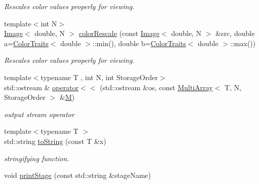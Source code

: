 \begin{DoxyCompactItemize}
\begin{DoxyCompactList}\small\item\em Rescales color values properly for viewing. \end{DoxyCompactList}\item 
\hypertarget{group___image_ga0d96ddd420fb39361b01256716c2c776}{{\footnotesize template$<$int N$>$ }\\\hyperlink{class_d_o_1_1_image}{Image}$<$ double, N $>$ \hyperlink{group___image_ga0d96ddd420fb39361b01256716c2c776}{color\-Rescale} (const \hyperlink{class_d_o_1_1_image}{Image}$<$ double, N $>$ \&src, double a=\hyperlink{struct_d_o_1_1_color_traits}{Color\-Traits}$<$ double $>$\-::min(), double b=\hyperlink{struct_d_o_1_1_color_traits}{Color\-Traits}$<$ double $>$\-::max())}\label{group___image_ga0d96ddd420fb39361b01256716c2c776}

\begin{DoxyCompactList}\small\item\em Rescales color values properly for viewing. \end{DoxyCompactList}\item 
\hypertarget{group___multi_array_ga9223155c64483239f48caab75fc0557d}{{\footnotesize template$<$typename T , int N, int Storage\-Order$>$ }\\std\-::ostream \& \hyperlink{group___multi_array_ga9223155c64483239f48caab75fc0557d}{operator$<$$<$} (std\-::ostream \&os, const \hyperlink{class_d_o_1_1_multi_array}{Multi\-Array}$<$ T, N, Storage\-Order $>$ \&\hyperlink{struct_d_o_1_1_m}{M})}\label{group___multi_array_ga9223155c64483239f48caab75fc0557d}

\begin{DoxyCompactList}\small\item\em output stream operator \end{DoxyCompactList}\item 
\hypertarget{group___utility_ga822e83b6eef265d4189aca150f0821db}{{\footnotesize template$<$typename T $>$ }\\std\-::string \hyperlink{group___utility_ga822e83b6eef265d4189aca150f0821db}{to\-String} (const T \&x)}\label{group___utility_ga822e83b6eef265d4189aca150f0821db}

\begin{DoxyCompactList}\small\item\em stringifying function. \end{DoxyCompactList}\item 
\hypertarget{group___utility_gaec63207d40454271e3d0e42802dbb73e}{void \hyperlink{group___utility_gaec63207d40454271e3d0e42802dbb73e}{print\-Stage} (const std\-::string \&stage\-Name)}\label{group___utility_gaec63207d40454271e3d0e42802dbb73e}


\end{DoxyCompactItemize}
